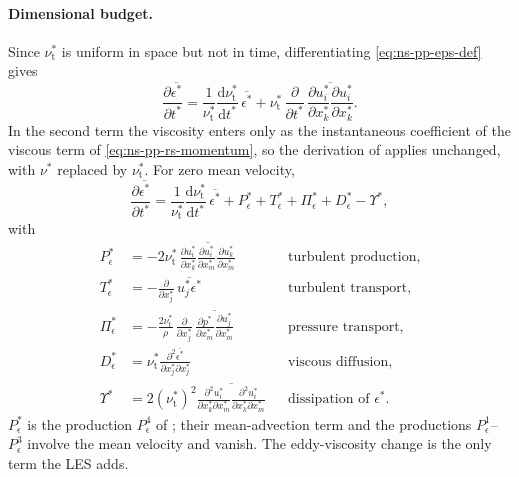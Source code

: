 \documentclass{article}
\begin{document}
\paragraph{Dimensional budget.}
Since $\nu_{\mathrm{t}}^*$ is uniform in space but not in time,
differentiating \eqref{eq:ns-pp-eps-def} gives
\begin{equation*}
  \frac{\partial \overline{\epsilon^*}}{\partial t^*}
  = \frac{1}{\nu_{\mathrm{t}}^*}\frac{\mathrm{d}\nu_{\mathrm{t}}^*}{\mathrm{d}t^*}\, \overline{\epsilon^*}
  + \nu_{\mathrm{t}}^*\, \frac{\partial}{\partial t^*}\, \overline{\frac{\partial u_i^*}{\partial x_k^*} \frac{\partial u_i^*}{\partial x_k^*}} .
\end{equation*}
In the second term the viscosity enters only as the instantaneous coefficient
of the viscous term of \eqref{eq:ns-pp-rs-momentum}, so the derivation of
\cite{mansour1987reynolds} applies unchanged, with $\nu^*$ replaced by
$\nu_{\mathrm{t}}^*$. For zero mean velocity,
\begin{equation}\label{eq:ns-pp-eps-rate}
  \frac{\partial \overline{\epsilon^*}}{\partial t^*}
  = \frac{1}{\nu_{\mathrm{t}}^*}\frac{\mathrm{d}\nu_{\mathrm{t}}^*}{\mathrm{d}t^*}\, \overline{\epsilon^*}
  + P_\epsilon^* + T_\epsilon^* + \Pi_\epsilon^* + D_\epsilon^* - \Upsilon^*,
\end{equation}
with
\begin{equation}\label{eq:ns-pp-eps-terms}
\begin{aligned}
  P_\epsilon^* &= -2\nu_{\mathrm{t}}^*\, \overline{\frac{\partial u_i^*}{\partial x_k^*} \frac{\partial u_i^*}{\partial x_m^*} \frac{\partial u_k^*}{\partial x_m^*}}
  && \text{turbulent production,} \\
  T_\epsilon^* &= -\frac{\partial}{\partial x_j^*}\, \overline{u_j^* \epsilon^*}
  && \text{turbulent transport,} \\
  \Pi_\epsilon^* &= -\frac{2\nu_{\mathrm{t}}^*}{\rho}\, \frac{\partial}{\partial x_j^*}\, \overline{\frac{\partial p^*}{\partial x_m^*} \frac{\partial u_j^*}{\partial x_m^*}}
  && \text{pressure transport,} \\
  D_\epsilon^* &= \nu_{\mathrm{t}}^* \frac{\partial^2 \overline{\epsilon^*}}{\partial x_j^* \partial x_j^*}
  && \text{viscous diffusion,} \\
  \Upsilon^* &= 2 \left(\nu_{\mathrm{t}}^*\right)^2 \overline{\frac{\partial^2 u_i^*}{\partial x_k^* \partial x_m^*} \frac{\partial^2 u_i^*}{\partial x_k^* \partial x_m^*}}
  && \text{dissipation of } \epsilon^* .
\end{aligned}
\end{equation}
$P_\epsilon^*$ is the production $P_\epsilon^4$ of \cite{mansour1987reynolds};
their mean-advection term and the productions $P_\epsilon^1$--$P_\epsilon^3$
involve the mean velocity and vanish. The eddy-viscosity change is the only
term the LES adds.
\end{document}
